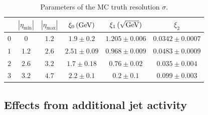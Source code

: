 \begin{table}[ht]
  \caption{Parameters of the MC truth resolution $\sigma$.}
  \begin{center}
    \begin{tabular}[h]{cccccc}
      \toprule
      & $|\eta_{\text{min}}|$ & $|\eta_{\text{max}}|$ & $\xi_{0}\,(\text{Ge}\kern-0.06667em\text{V})$ & $\xi_{1}\,(\sqrt{\text{Ge}\kern-0.06667em\text{V}})$ & $\xi_{2}$ \\
      \midrule
      $0$ & $0$ & $1.2$ & $1.9\pm0.2$ & $1.205\pm0.006$  & $0.0342\pm0.0007$ \\
      $1$ & $1.2$ & $2.6$ & $2.51\pm0.09$ & $0.968\pm0.009$  & $0.0483\pm0.0009$ \\
      $2$ & $2.6$ & $3.2$ & $1.7\pm0.18$ & $0.76\pm0.02$  & $0.035\pm0.004$ \\
      $3$ & $3.2$ & $4.7$ & $2.2\pm0.1$ & $0.2\pm0.1$  & $0.099\pm0.003$ \\
      \bottomrule
    \end{tabular}
  \end{center}
  \label{tab:ResFit:QCDMC:MCTruthReso}
\end{table}




\subsection{Effects from additional jet activity}\label{sec:ResFit:QCDMC:AddJetAct}




